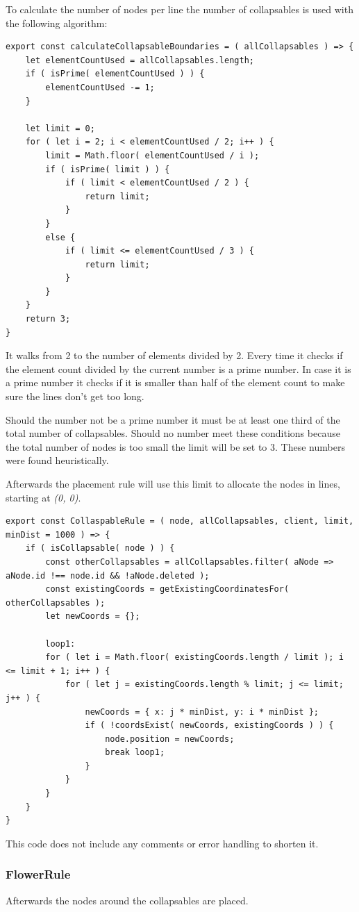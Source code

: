 To calculate the number of nodes per line the number of collapsables is used with the following algorithm:
\lstset{language=JavaScript}
\begin{lstlisting}[caption={Algorithm to determine the number of Collapsables per Row}]
export const calculateCollapsableBoundaries = ( allCollapsables ) => {
	let elementCountUsed = allCollapsables.length;
	if ( isPrime( elementCountUsed ) ) {
		elementCountUsed -= 1;
	}

	let limit = 0;
	for ( let i = 2; i < elementCountUsed / 2; i++ ) {
		limit = Math.floor( elementCountUsed / i );
		if ( isPrime( limit ) ) {
			if ( limit < elementCountUsed / 2 ) {
				return limit;
			}
		}
		else {
			if ( limit <= elementCountUsed / 3 ) {
				return limit;
			}
		}
	}
	return 3;
}
\end{lstlisting}

It walks from 2 to the number of elements divided by 2. Every time it checks if the element count divided by the current number is a prime number. In case it is a prime number it checks if it is smaller than half of the element count to make sure the lines don't get too long.

Should the number not be a prime number it must be at least one third of the total number of collapsables. Should no number meet these conditions because the total number of nodes is too small the limit will be set to 3. These numbers were found heuristically.

Afterwards the placement rule will use this limit to allocate the nodes in lines, starting at \emph{(0, 0)}.
\begin{lstlisting}[caption={Placing all Collapsables}]
export const CollaspableRule = ( node, allCollapsables, client, limit, minDist = 1000 ) => {
	if ( isCollapsable( node ) ) {
		const otherCollapsables = allCollapsables.filter( aNode => aNode.id !== node.id && !aNode.deleted );
		const existingCoords = getExistingCoordinatesFor( otherCollapsables );
		let newCoords = {};

		loop1:
		for ( let i = Math.floor( existingCoords.length / limit ); i <= limit + 1; i++ ) {
			for ( let j = existingCoords.length % limit; j <= limit; j++ ) {
				newCoords = { x: j * minDist, y: i * minDist };
				if ( !coordsExist( newCoords, existingCoords ) ) {
					node.position = newCoords;
					break loop1;
				}
			}
		} 
	}
}
\end{lstlisting}
This code does not include any comments or error handling to shorten it.

\subsubsection{FlowerRule}
Afterwards the nodes around the collapsables are placed. 

